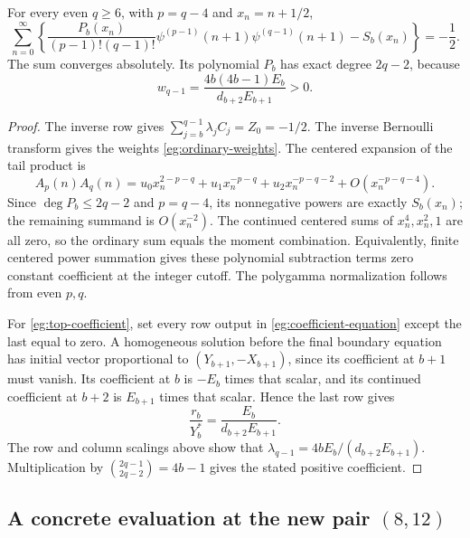 \begin{corollary}\label{eg:ordinary-family}
For every even $q\ge6$, with $p=q-4$ and $x_n=n+1/2$,
\begin{equation}\label{eg:ordinary-family-equation}
 \boxed{\displaystyle
 \sum_{n=0}^{\infty}\left\{
 \frac{P_b(x_n)}{(p-1)!(q-1)!}
   \psi^{(p-1)}(n+1)\psi^{(q-1)}(n+1)-S_b(x_n)
                  \right\}=-\frac12.}
\end{equation}
The sum converges absolutely. Its polynomial $P_b$ has exact degree
$2q-2$, because
\begin{equation}\label{eg:top-coefficient}
 w_{q-1}=\frac{4b(4b-1)E_b}{d_{b+2}E_{b+1}}>0.
\end{equation}
\end{corollary}

\begin{proof}
The inverse row gives $\sum_{j=b}^{q-1}\lambda_jC_j=Z_0=-1/2$.
The inverse Bernoulli transform gives the weights
\eqref{eg:ordinary-weights}. The centered expansion of the tail product
is
\[
 A_p(n)A_q(n)=u_0x_n^{2-p-q}+u_1x_n^{-p-q}
                         +u_2x_n^{-p-q-2}+O(x_n^{-p-q-4}).
\]
Since $\deg P_b\le2q-2$ and $p=q-4$, its nonnegative powers are
exactly $S_b(x_n)$; the remaining summand is $O(x_n^{-2})$.
The continued centered sums of $x_n^4,x_n^2,1$ are all zero,
so the ordinary sum equals the moment combination. Equivalently,
finite centered power summation gives these polynomial subtraction
terms zero constant coefficient at the integer cutoff. The polygamma
normalization follows from even $p,q$.

For \eqref{eg:top-coefficient}, set every row output in
\eqref{eg:coefficient-equation} except the last equal to zero.
A homogeneous solution before the final boundary equation has initial
vector proportional to $(Y_{b+1},-X_{b+1})$, since its coefficient
at $b+1$ must vanish. Its coefficient at $b$ is $-E_b$ times that
scalar, and its continued coefficient at $b+2$ is $E_{b+1}$ times
that scalar. Hence the last row gives
\[
        \frac{r_b}{Y_b^*}=\frac{E_b}{d_{b+2}E_{b+1}}.
\]
The row and column scalings above show that
$\lambda_{q-1}=4bE_b/(d_{b+2}E_{b+1})$. Multiplication by
$\binom{2q-1}{2q-2}=4b-1$ gives the stated positive coefficient.
\end{proof}

\subsection{A concrete evaluation at the new pair \texorpdfstring{$(8,12)$}{(8,12)}}

